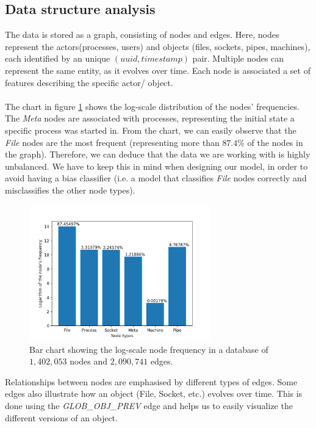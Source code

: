 	\subsection{Data structure analysis} \label{Section: prep/datastructure}
	The data is stored as a graph, consisting of nodes and edges. Here, nodes represent the actors(processes, users) and objects (files, sockets, pipes, machines), each identified by an unique $(uuid, timestamp)$ pair. Multiple nodes can represent the same entity, as it evolves over time. Each node is associated a set of features describing the specific actor/ object. 
	\\ \\
	The chart in figure \ref{Figure 2.1.1} shows the log-scale distribution of the nodes' frequencies. The \textit{Meta} nodes are associated with processes, representing the initial state a specific process was started in. From the chart, we can easily observe that the \textit{File} nodes are the most frequent (representing more than $87.4\%$ of the nodes in the graph). Therefore, we can deduce that the data we are working with is highly unbalanced. We have to keep this in mind when designing our model, in order to avoid having a bias classifier (i.e. a model that classifies \textit{File} nodes correctly and misclassifies the other node types). 
	\begin{figure}[H]
		\centering

		\includegraphics[width=0.7\textwidth]{graphics/node-freq-graph}
		\caption[\textbf{Log-scale node frequency}]{
			Bar chart showing the log-scale node frequency in a database of $1,402,053$ nodes and $2,090,741$ edges. 
		}
		\label{Figure 2.1.1}
	\end{figure}
	Relationships between nodes are emphasised by different types of edges. Some edges also illustrate how an object (File, Socket, etc.) evolves over time. This is done using the \textit{GLOB\_OBJ\_PREV} edge and helps us to easily visualize the different versions of an object.
